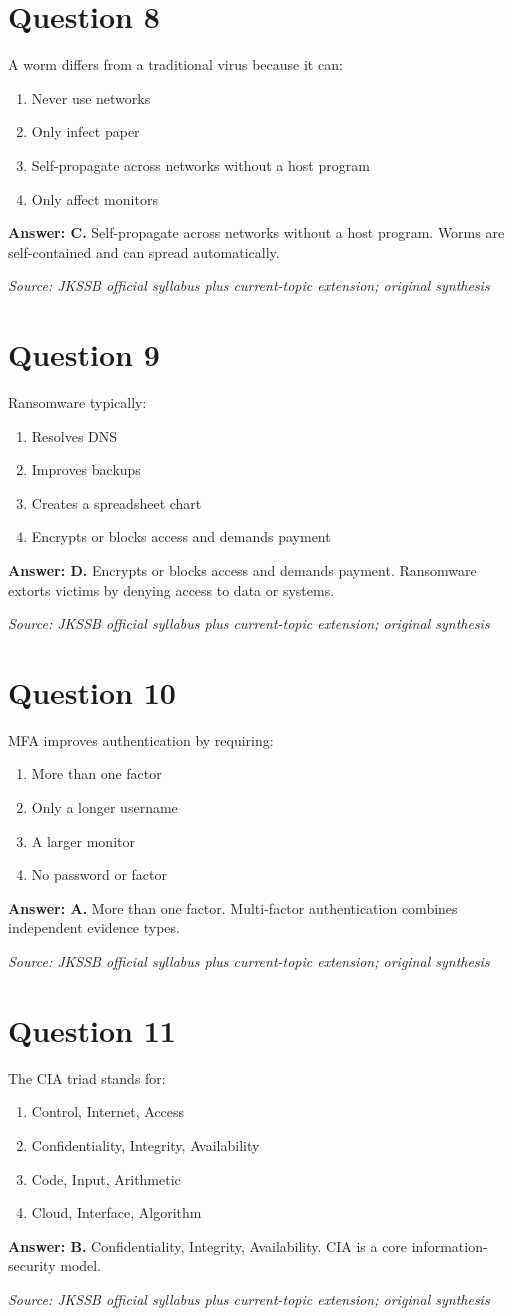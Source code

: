 \documentclass[11pt,a4paper]{book}
\newcommand{\source}[1]{\par\smallskip\textit{Source: #1}}
\newcommand{\answer}[2]{\par\textbf{Answer: #1.} #2}
\begin{document}
\section*{Question 8}
A worm differs from a traditional virus because it can:
\begin{enumerate}[label=\Alph*.]
\item Never use networks
\item Only infect paper
\item Self-propagate across networks without a host program
\item Only affect monitors
\end{enumerate}
\answer{C}{Self-propagate across networks without a host program. Worms are self-contained and can spread automatically.}
\source{JKSSB official syllabus plus current-topic extension; original synthesis}
\section*{Question 9}
Ransomware typically:
\begin{enumerate}[label=\Alph*.]
\item Resolves DNS
\item Improves backups
\item Creates a spreadsheet chart
\item Encrypts or blocks access and demands payment
\end{enumerate}
\answer{D}{Encrypts or blocks access and demands payment. Ransomware extorts victims by denying access to data or systems.}
\source{JKSSB official syllabus plus current-topic extension; original synthesis}
\section*{Question 10}
MFA improves authentication by requiring:
\begin{enumerate}[label=\Alph*.]
\item More than one factor
\item Only a longer username
\item A larger monitor
\item No password or factor
\end{enumerate}
\answer{A}{More than one factor. Multi-factor authentication combines independent evidence types.}
\source{JKSSB official syllabus plus current-topic extension; original synthesis}
\section*{Question 11}
The CIA triad stands for:
\begin{enumerate}[label=\Alph*.]
\item Control, Internet, Access
\item Confidentiality, Integrity, Availability
\item Code, Input, Arithmetic
\item Cloud, Interface, Algorithm
\end{enumerate}
\answer{B}{Confidentiality, Integrity, Availability. CIA is a core information-security model.}
\source{JKSSB official syllabus plus current-topic extension; original synthesis}
\end{document}
